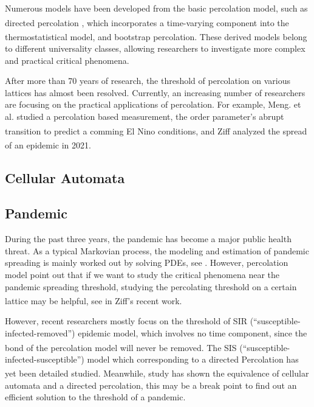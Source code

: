 \documentclass{article}
\newcommand{\upcite}[1]{\textsuperscript{\cite{#1}}}
\begin{document}
Numerous models have been developed from the basic percolation model, such as directed percolation \upcite{OBUKHOV1980145}, which incorporates a time-varying component into the thermostatistical model, and bootstrap percolation\upcite{ADLER1991453}. These derived models belong to different universality classes, allowing researchers to investigate more complex and practical critical phenomena.

After more than 70 years of research, the threshold of percolation on various lattices has almost been resolved. Currently, an increasing number of researchers are focusing on the practical applications of percolation. For example, Meng. et al. studied a percolation based measurement, the order parameter's abrupt transition to predict a comming El Nino conditions\upcite{meng_percolation_2017}, and Ziff analyzed the spread of an epidemic in 2021.\upcite{ziff_percolation_2021}


\subsection{Cellular Automata}

\subsection{Pandemic}
During the past three years, the pandemic has become a major public health threat. As a typical Markovian process, the modeling and estimation of pandemic spreading is mainly worked out by solving PDEs, see \cite{JI20145067} \cite{COOPER2020110057}. However, percolation model point out that if we want to study the critical phenomena near the pandemic spreading threshold, studying the percolating threshold on a certain lattice may be helpful, see in Ziff's recent work\upcite{ziff_percolation_2021}.

However, recent researchers mostly focus on the threshold of SIR (“susceptible-infected-removed”) epidemic model, which involves no time component, since the bond of the percolation model will never be removed.\upcite{araujo_recent_2014} The SIS (“susceptible-infected-susceptible”) model which corresponding to a directed Percolation has yet been detailed studied. Meanwhile, study\upcite{domany_equivalence_1984} has shown the equivalence of cellular automata and a directed percolation, this may be a break point to find out an efficient solution to the threshold of a pandemic.
\end{document}
